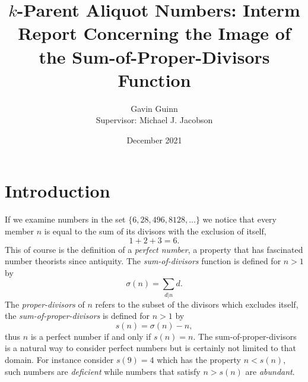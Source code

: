 \documentclass{article}
\title{$k$-Parent Aliquot Numbers: Interm Report Concerning the Image of the Sum-of-Proper-Divisors Function}
\author{Gavin Guinn\\{\small Supervisor: Michael J. Jacobson}}
\date{December 2021}
\theoremstyle{definition}
\begin{document}
\maketitle
%
\section{Introduction}
If we examine numbers in the set $\{6, 28, 496, 8128, ...\}$ we notice that every member $n$ is equal to the sum of its divisors  with the exclusion of itself, 
$$1+2+3 = 6.$$
This of course is the definition of a \textit{perfect number}, a property that has fascinated number theorists since antiquity. The \textit{sum-of-divisors} function is defined for $n > 1$ by
$$\sigma(n) = \sum_{d|n} d.$$
The \textit{proper-divisors} of $n$ refers to the subset of the divisors which excludes itself, the \textit{sum-of-proper-divisors} is defined for $n > 1$ by
$$s(n) = \sigma(n) - n,$$
thus $n$ is a perfect number if and only if $s(n) = n$. The sum-of-proper-divisors is a natural way to consider perfect numbers but is certainly not limited to that domain. For instance consider $s(9) = 4$ which has the property $n < s(n)$, such numbers are \textit{deficient} while numbers that satisfy $n > s(n)$ are \textit{abundant}.
\end{document}
